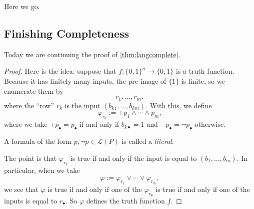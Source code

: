 \documentclass[../notes.tex]{subfiles}
\begin{document}

Here we go.

\subsection{Finishing Completeness}

Today we are continuing the proof of \autoref{thm:langcomplete}.
\langcomplete*
\begin{proof}
	Here is the idea: suppose that $f:\{0,1\}^n\to\{0,1\}$ is a truth function. Because it has finitely many inputs, the pre-image of $\{1\}$ is finite, so we enumerate them by
	\[r_1,\ldots,r_m,\]
	where the ``row'' $r_k$ is the input $(b_{k1},\ldots,b_{km})$. With this, we define
	\[\varphi_{r_k}:=\pm p_1\land\cdots\land p_m,\]
	where we take $+p_\bullet=p_\bullet$ if and only if $b_{k\bullet}=1$ and $-p_\bullet=\lnot p_\bullet$ otherwise.
	\begin{definition}[Literal]
		A formula of the form $p,\lnot p\in\mathcal L(P)$ is called a \textit{literal}.
	\end{definition}
	The point is that $\varphi_{r_k}$ is true if and only if the input is equal to $(b_1,\ldots,b_m)$. In particular, when we take
	\[\varphi:=\varphi_{r_1}\lor\cdots\lor\varphi_{r_m},\]
	we see that $\varphi$ is true if and only if one of the $\varphi_{r_\bullet}$ is true if and only if one of the inputs is equal to $r_\bullet$. So $\varphi$ defines the truth function $f$.
\end{proof}
\end{document}
